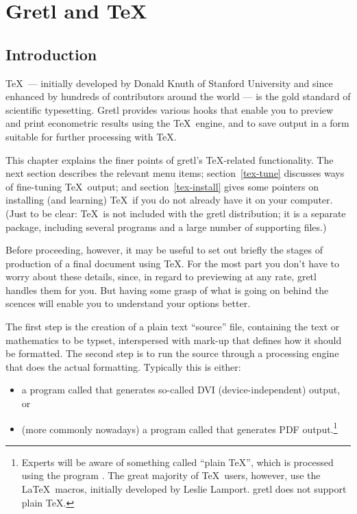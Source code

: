 \chapter{Gretl and \TeX}
\label{chap:gretltex}


\section{Introduction}
\label{tex-intro}

\TeX\ --- initially developed by Donald Knuth of Stanford University
and since enhanced by hundreds of contributors around the world --- is
the gold standard of scientific typesetting.  Gretl provides
various hooks that enable you to preview and print econometric results
using the \TeX\ engine, and to save output in a form suitable for
further processing with \TeX.

This chapter explains the finer points of gretl's \TeX-related
functionality.  The next section describes the relevant menu items;
section~\ref{tex-tune} discusses ways of fine-tuning \TeX\ output; and
section~\ref{tex-install} gives some pointers on installing (and
learning) \TeX\ if you do not already have it on your computer.  (Just
to be clear: \TeX\ is not included with the gretl distribution;
it is a separate package, including several programs and a large
number of supporting files.)

Before proceeding, however, it may be useful to set out briefly the
stages of production of a final document using \TeX.  For the most
part you don't have to worry about these details, since, in regard to
previewing at any rate, gretl handles them for you.  But having
some grasp of what is going on behind the scences will enable you to
understand your options better.

The first step is the creation of a plain text ``source'' file,
containing the text or mathematics to be typset, interspersed with
mark-up that defines how it should be formatted.  The second step is
to run the source through a processing engine that does the actual
formatting.  Typically this is either:
\begin{itemize}
\item a program called  that generates so-called DVI
  (device-independent) output, or
\item (more commonly nowadays) a program called  that
  generates PDF output.\footnote{Experts will be aware of something
    called ``plain \TeX'', which is processed using the program
    .  The great majority of \TeX\ users, however, use the
    \LaTeX\ macros, initially developed by Leslie Lamport.
    gretl does not support plain \TeX.}
\end{itemize}

